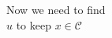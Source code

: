 \documentclass[preview]{standalone}
\begin{document}
\begin{center}
Now we need to find \\$u$ to keep $x \in \mathcal{C}$
\end{center}
\end{document}
